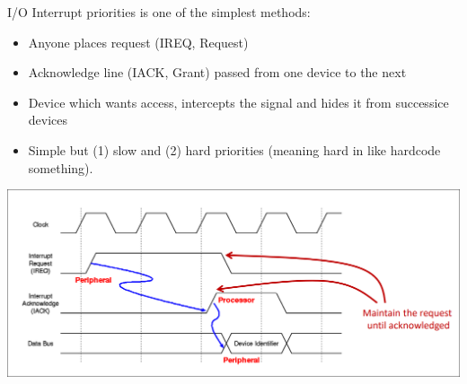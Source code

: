 \begin{parag}{I/O Interrupt priorities}
     is one of the simplest methods:
	\begin{itemize}
	    \item Anyone places request (IREQ, Request)
	    \item Acknowledge line (IACK, Grant) passed from one device to the next 
	    \item Device which wants access, intercepts the signal and hides it from successice devices 
	    \item Simple but (1) slow and (2) hard priorities (meaning hard in like hardcode something).
	\end{itemize}
	\begin{center}
	\includegraphics[scale=0.2]{screenshots/2025-10-22_14.png}
	\end{center}
\end{parag}
